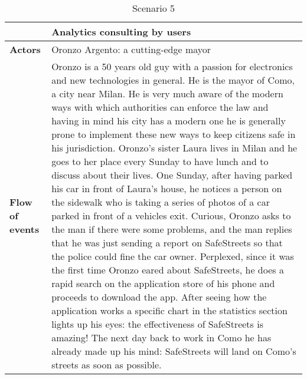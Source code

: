 \begin{table}[!htbp]
	\centering
\begin{tabular}{lp{9cm}}
\hline
\bf\large  &\bf\large Analytics consulting by users\\
\hline
\hline

\bf Actors&Oronzo Argento: a cutting-edge mayor \\
\hline
\bf Flow of events&
Oronzo is a 50 years old guy with a passion for electronics and new technologies in general. He is the mayor of Como, a city near Milan. He is very much aware of the modern ways with which authorities can enforce the law and having in mind his city has a modern one he is generally prone to implement these new ways to keep citizens safe in his jurisdiction.
Oronzo's sister Laura lives in Milan and he goes to her place every Sunday to have lunch and to discuss about their lives. One Sunday, after having parked his car in front of Laura's house, he notices a person on the sidewalk who is taking a series of photos of a car parked in front of a vehicles exit. Curious, Oronzo asks to the man if there were some problems, and the man replies that he was just sending a report on SafeStreets so that the police could fine the car owner. Perplexed, since it was the first time Oronzo eared about SafeStreets, he does a rapid search on the application store of his phone and proceeds to download the app. After seeing how the application works a specific chart in the statistics section 
lights up his eyes: the effectiveness of SafeStreets is amazing! The next day back to work in Como he has already made up his mind: SafeStreets will land on Como's streets as soon as possible.
\end{tabular}
\caption{Scenario 5} 
\label{tab:scenariofive}
\end{table}